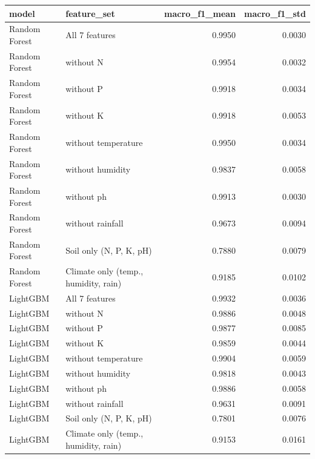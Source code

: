 \begin{tabular}{llrr}
\toprule
model & feature_set & macro_f1_mean & macro_f1_std \\
\midrule
Random Forest & All 7 features & 0.9950 & 0.0030 \\
Random Forest & without N & 0.9954 & 0.0032 \\
Random Forest & without P & 0.9918 & 0.0034 \\
Random Forest & without K & 0.9918 & 0.0053 \\
Random Forest & without temperature & 0.9950 & 0.0034 \\
Random Forest & without humidity & 0.9837 & 0.0058 \\
Random Forest & without ph & 0.9913 & 0.0030 \\
Random Forest & without rainfall & 0.9673 & 0.0094 \\
Random Forest & Soil only (N, P, K, pH) & 0.7880 & 0.0079 \\
Random Forest & Climate only (temp., humidity, rain) & 0.9185 & 0.0102 \\
LightGBM & All 7 features & 0.9932 & 0.0036 \\
LightGBM & without N & 0.9886 & 0.0048 \\
LightGBM & without P & 0.9877 & 0.0085 \\
LightGBM & without K & 0.9859 & 0.0044 \\
LightGBM & without temperature & 0.9904 & 0.0059 \\
LightGBM & without humidity & 0.9818 & 0.0043 \\
LightGBM & without ph & 0.9886 & 0.0058 \\
LightGBM & without rainfall & 0.9631 & 0.0091 \\
LightGBM & Soil only (N, P, K, pH) & 0.7801 & 0.0076 \\
LightGBM & Climate only (temp., humidity, rain) & 0.9153 & 0.0161 \\
\bottomrule
\end{tabular}
